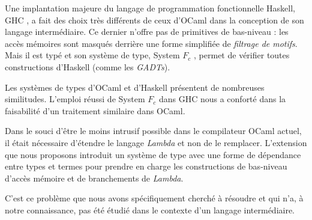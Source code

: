 Une implantation majeure du langage de programmation fonctionnelle
Haskell, GHC \cite{Marlow98thenew}, a fait des choix très différents de ceux
d'OCaml dans la conception de son langage intermédiaire.  Ce dernier n'offre
pas de primitives de bas-niveau : les accès mémoires sont masqués derrière une
forme simplifiée de \emph{filtrage de motifs}. Mais il est typé et son système
de type, System $F_c$ \cite{Sulzmann07systemf}, permet de vérifier toutes
constructions d'Haskell (comme les \emph{GADTs}).

Les systèmes de types d'OCaml et d'Haskell présentent de nombreuses
similitudes. L'emploi réussi de System $F_c$ dans GHC nous a conforté dans la
faisabilité d'un traitement similaire dans OCaml.

Dans le souci d'être le moins intrusif possible dans le compilateur
OCaml actuel, il était nécessaire d'étendre le langage \emph{Lambda} et non de
le remplacer.  L'extension que nous proposons introduit un système de type avec
une forme de dépendance entre types et termes pour prendre en charge les
constructions de bas-niveau d'accès mémoire et de branchements de \emph{Lambda}.

C'est ce problème que nous avons spécifiquement cherché à résoudre et qui n'a,
à notre connaissance, pas été étudié dans le contexte d'un langage
intermédiaire.

%


